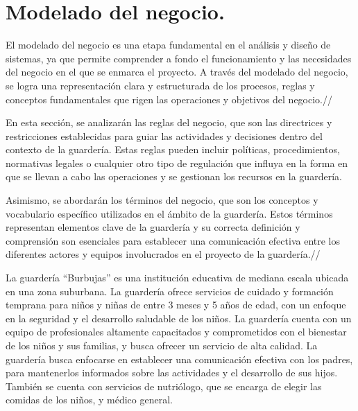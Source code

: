 
\chapter{Modelado del negocio.}

El modelado del negocio es una etapa fundamental en el análisis y diseño de sistemas, ya que permite comprender a fondo el funcionamiento y las necesidades del negocio en el que se enmarca el proyecto. A través del modelado del negocio, se logra una representación clara y estructurada de los procesos, reglas y conceptos fundamentales que rigen las operaciones y objetivos del negocio.//

En esta sección, se analizarán las reglas del negocio, que son las directrices y restricciones establecidas para guiar las actividades y decisiones dentro del contexto de la guardería. Estas reglas pueden incluir políticas, procedimientos, normativas legales o cualquier otro tipo de regulación que influya en la forma en que se llevan a cabo las operaciones y se gestionan los recursos en la guardería.

Asimismo, se abordarán los términos del negocio, que son los conceptos y vocabulario específico utilizados en el ámbito de la guardería. Estos términos representan elementos clave de la guardería y su correcta definición y comprensión son esenciales para establecer una comunicación efectiva entre los diferentes actores y equipos involucrados en el proyecto de la guardería.//

La guardería “Burbujas” es una institución educativa de mediana escala ubicada en una zona suburbana. La guardería ofrece servicios de cuidado y formación temprana para niños y niñas de entre 3 meses y 5 años de edad, con un enfoque en la seguridad y el desarrollo saludable de los niños. La guardería cuenta con un equipo de profesionales altamente capacitados y comprometidos con el bienestar de los niños y sus familias, y busca ofrecer un servicio de alta calidad. La guardería busca enfocarse en establecer una comunicación efectiva con los padres, para mantenerlos informados sobre las actividades y el desarrollo de sus hijos. También se cuenta con servicios de nutriólogo, que se encarga de elegir las comidas de los niños, y médico general.


